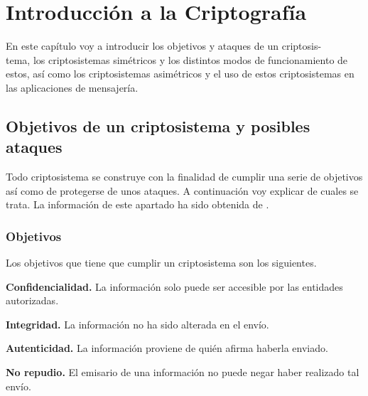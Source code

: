 \chapter{Introducción a la Criptografía}
En este capítulo voy a introducir los objetivos y ataques de un criptosis-\\tema, los criptosistemas simétricos y los distintos modos de funcionamiento de estos, así como los criptosistemas asimétricos y el uso de estos  criptosistemas en las aplicaciones de mensajería.

\section{Objetivos de un criptosistema y posibles ataques}
Todo criptosistema se construye con la finalidad de cumplir una serie de objetivos así como de protegerse de unos ataques. A continuación voy explicar de cuales se trata.
La información de este apartado ha sido obtenida de \cite{apuntesCriptografia}.\\ 
\subsection{Objetivos}
Los objetivos que tiene que cumplir un criptosistema son los siguientes.
\begin{description}
	\item \textbf{Confidencialidad.} 
		 La información solo puede ser accesible por las entidades autorizadas. 
	\item \textbf{Integridad.} 
		La información no ha sido alterada en el envío.
	\item \textbf{Autenticidad.} 
		La información proviene de quién afirma haberla enviado.
	\item \textbf{No repudio.}  
		El emisario de una información no puede negar haber realizado tal envío.
\end{description}
